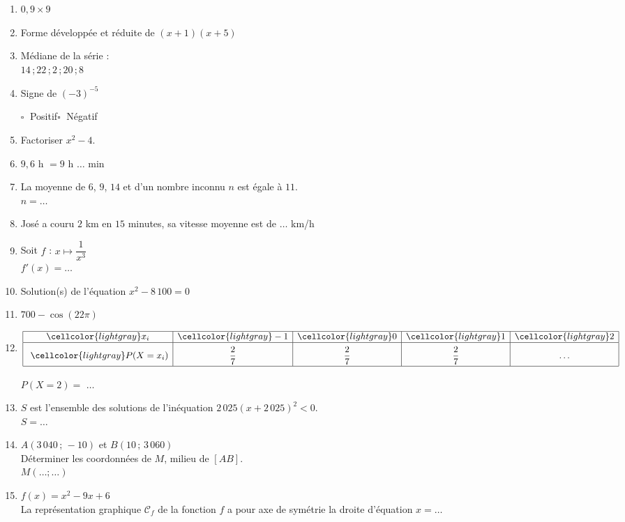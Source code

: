 \documentclass[a4paper,11pt,landscape,exos]{nsi} %
\begin{document}
\begin{multicols}{2}
\maketitle

\begin{enumerate}[]
    \item $0{,}9 \times 9$ 
	\item Forme développée et réduite de $(x+1)(x+5)$
	\item Médiane de la série :\\$14$\,;\,$22$\,;\,$2$\,;\,$20$\,;\,$8$ 
	\item Signe de  $(-3)^{-5}$ 
    
    	$\square\;$ Positif\qquad $\square\;$ Négatif\qquad 
	\item  Factoriser  $x^2-4$.
	\item $9{,}6$  h $ = 9$ h $\ldots$ min
	\item La moyenne de $6$, $9$, $14$ et d'un nombre inconnu $n$ est égale à $11$.\\$n=\ldots$
	\item José a couru $2$ km en $15$ minutes, sa vitesse moyenne est de   $\ldots$ km/h
	\item Soit $f$ : $x\longmapsto \dfrac{1}{x^3}$\\$f'(x)=\ldots$
	\item Solution(s) de l'équation  $x^2-8\,100=0$
	\item  $700 - \cos(22\pi)$
	\item $\renewcommand{\arraystretch}{1}
\begin{array}{|c|c|c|c|c|}
\hline
\cellcolor{lightgray} x_i & \cellcolor{lightgray} -1 & \cellcolor{lightgray} 0 & \cellcolor{lightgray} 1 & \cellcolor{lightgray} 2\\
\hline
 \rule[-2ex]{0pt} {6ex}\ \cellcolor{lightgray} P(X=x_i) & \dfrac{2}{7} & \dfrac{2}{7} & \dfrac{2}{7} & \ldots\\
\hline
 \end{array}
\renewcommand{\arraystretch}{1}$


\medskip
 $P(X=2)=$ $\ldots$
	\item $S$ est l'ensemble des  solutions  de l'inéquation
             $2\,025(x+2\,025)^2 < 0$.\\$S=\ldots$
	\item $A(3\,040\,;\,-10)$ et $B(10\,;\,3\,060)$\\
         Déterminer les coordonnées de $M$, milieu de $[AB]$.\\$M(\ldots;\ldots)$
	\item $f(x)=x^2-9x+6$ \\
        La représentation graphique $\mathcal{C}_f$ de la fonction $f$ a pour axe de symétrie la droite d'équation $x=$$\ldots$       
\end{enumerate}


\end{multicols}
\end{document}
